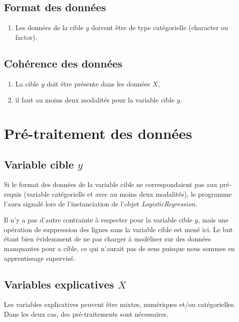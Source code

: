 \documentclass[10pt,french]{report}
\begin{document}
	\subsection{Format des données}

	\begin{enumerate}
		\item Les données de la cible $y$ doivent être de type catégorielle (character ou factor).
	\end{enumerate}

	\subsection{Cohérence des données}

	\begin{enumerate}
		\item La cible $y$ doit être présente dans les données $X$,
		\item il faut au moins deux modalités pour la variable cible $y$.
	\end{enumerate}

	\section{Pré-traitement des données}

	\subsection{Variable cible $y$}

	Si le format des données de la variable cible ne correspondaient pas aux pré-requis (variable catégorielle et avec au moins deux modalités), le programme l'aura signalé lors de l'instanciation de l'objet \textit{LogisticRegression}.

	Il n'y a pas d'autre contrainte à respecter pour la variable cible $y$, mais une opération de suppression des lignes sans la variable cible est mené ici. Le but étant bien évidemment de ne pas charger à modéliser sur des données manquantes pour a cible, ce qui n'aurait pas de sens puisque nous sommes en apprentissage supervisé.

	\subsection{Variables explicatives $X$}

	Les variables explicatives peuvent être mixtes, numériques et/ou catégorielles. Dans les deux cas, des pré-traitements sont nécessaires.
\end{document}
